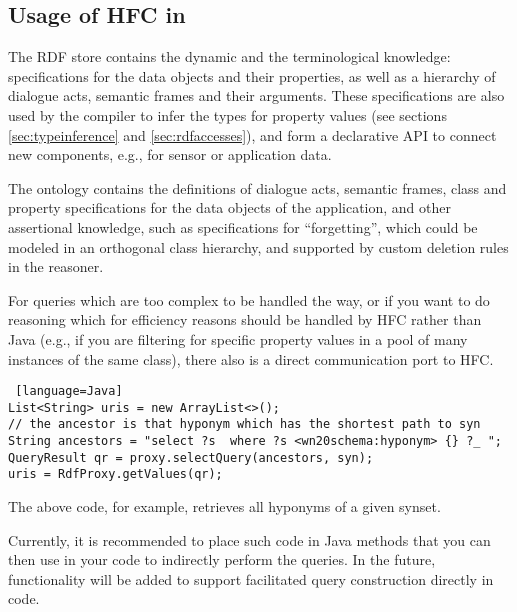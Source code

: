 \subsection{Usage of HFC in \vonda} \label{hfc_usage}

The RDF store contains the dynamic and the terminological knowledge:
specifications for the data objects and their properties, as well as a
hierarchy of  dialogue acts,  semantic frames and their arguments. These
specifications are also used by the compiler to infer the types for property
values (see sections \ref{sec:typeinference} and \ref{sec:rdfaccesses}), and form a declarative API to
connect new components, e.g., for sensor or application data.

The ontology contains the definitions of dialogue acts, semantic frames, class
and property specifications for the data objects of the application, and other
assertional knowledge, such as specifications for ``forgetting'', which could
be modeled in an orthogonal class hierarchy, and supported by custom deletion
rules in the reasoner.

For queries which are too complex to be handled the \vonda way, or if you want to do reasoning which for efficiency reasons should be handled by HFC rather than Java (e.g., if you are filtering for specific property values in a pool of many instances of the same class), there also is a direct communication port to HFC.

\begin{lstlisting} [language=Java]
List<String> uris = new ArrayList<>();
// the ancestor is that hyponym which has the shortest path to syn
String ancestors = "select ?s  where ?s <wn20schema:hyponym> {} ?_ ";
QueryResult qr = proxy.selectQuery(ancestors, syn);
uris = RdfProxy.getValues(qr);
\end{lstlisting}

The above code, for example, retrieves all hyponyms of a given synset.

Currently, it is recommended to place such code in Java methods that you can then use in your \vonda code to indirectly perform the queries. In the future, functionality will be added to support facilitated query construction directly in \vonda code.

